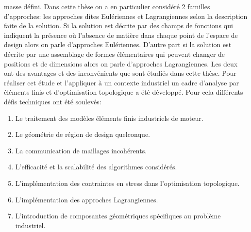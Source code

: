 \begin{mdframed}[hidealllines=true,backgroundcolor=lightgray!20]
masse défini. Dans cette thèse on a en particulier considéré 2 familles d'approches: les approches dites Eulériennes et Lagrangiennes \cite{zhang2016lagrangian} selon la description faite de la solution. Si la solution est décrite par des champs de fonctions qui indiquent la présence où l'absence de matière dans chaque point de l'espace de design alors on parle d'approches Eulériennes. D'autre part si la solution est décrite par une assemblage de formes élémentaires qui peuvent changer de positions et de dimensions alors on parle d'approches Lagrangiennes. Les deux ont des avantages et des inconvénients que sont étudiés dans cette thèse. Pour réaliser cet étude et l'appliquer à un contexte industriel un cadre d'analyse par éléments finis et d'optimisation topologique a été développé. Pour cela différents défis techniques ont été soulevés:
\begin{enumerate}
\item Le traitement des modèles éléments finis industriels de moteur. 
\item Le géométrie de région de design quelconque.
\item La communication de maillages incohérents.
\item L'efficacité et la scalabilité des algorithmes considérés.
\item L'implémentation des contraintes en stress dans l'optimisation topologique. 
\item L'implémentation des approches Lagrangiennes.
\item L'introduction de composantes géométriques spécifiques au problème industriel. 
\end{enumerate} 
\end{mdframed}

